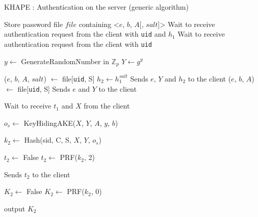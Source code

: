 \documentclass[../report.tex]{subfiles}
\begin{document}
\begin{algorithm}
\caption{KHAPE : Authentication on the server (generic algorithm)}
\label{alg:login_server}
\begin{algorithmic}
\Require Store password file $file$ containing <$e$, $b$, $A$[, $salt$]>
    \State Wait to receive authentication request from the client with \verb|uid| and $h_1$
\Else
    \State Wait to receive authentication request from the client with \verb|uid|
\EndIf

\State $y \gets$ GenerateRandomNumber in $\mathbb{Z}_p$
\State $Y \gets g^y$

    \State ($e$, $b$, $A$, $salt$) $\gets$ file[\verb|uid|, S] %
    \State $h_2 \gets h_1^{salt}$
    \State Sends $e$, $Y$ and $h_2$ to the client
\Else
    \State ($e$, $b$, $A$) $\gets$ file[\verb|uid|, S] %
    \State Sends $e$ and $Y$ to the client
\EndIf


\State Wait to receive $t_1$ and $X$ from the client


\State $o_s \gets$ KeyHidingAKE($X$, $Y$, $A$, $y$, $b$)

\State $k_2 \gets$ Hash(sid, C, S, $X$, $Y$, $o_s$)


    \State $t_2 \gets$ False
\Else
    \State $t_2 \gets$ PRF($k_2$, 2)
\EndIf


\State Sends $t_2$ to the client


    \State $K_2 \gets$ False
\Else
    \State $K_2 \gets$ PRF($k_2$, 0)
\EndIf

\State output $K_2$
\end{algorithmic}
\end{algorithm}




\end{document}
